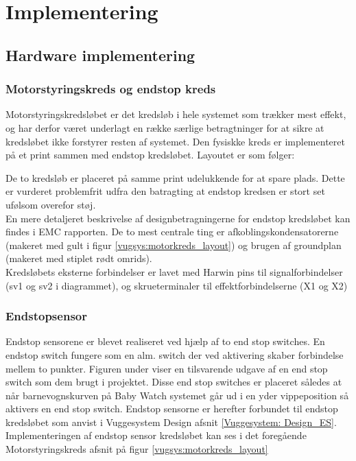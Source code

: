 \section{Implementering}
\label{Vuggesystem: Implementering} 
\subsection{Hardware implementering}

\subsubsection{Motorstyringskreds og endstop kreds}
Motorstyringskredsløbet er det kredsløb i hele systemet som trækker mest effekt, og har derfor været underlagt en række særlige betragtninger for at sikre at kredsløbet ikke forstyrer resten af systemet. Den fysiskke kreds er implementeret på et print sammen med endstop kredsløbet. Layoutet er som følger:


De to kredsløb er placeret på samme print udelukkende for at spare plads. Dette er vurderet problemfrit udfra den batragting at endstop kredsen er stort set ufølsom overefor støj.\\

En mere detaljeret beskrivelse af designbetragningerne for endstop kredsløbet kan findes i EMC rapporten. De to mest centrale ting er afkoblingskondensatorerne (makeret med gult i figur \ref{vugsys:motorkreds_layout}) og brugen af groundplan (makeret med stiplet rødt omrids). \\

Kredsløbets eksterne forbindelser er lavet med Harwin pins til signalforbindelser (sv1 og sv2 i diagrammet), og skrueterminaler til effektforbindelserne (X1 og X2)

\newpage
\subsubsection{Endstopsensor}\label{Vuggesystem: Implementering_ES} 
Endstop sensorene er blevet realiseret ved hjælp af to end stop switches. En endstop switch fungere som en alm. switch der ved aktivering skaber forbindelse mellem to punkter. Figuren under viser en tilsvarende udgave af en end stop switch som dem brugt i projektet.
 Disse end stop switches er placeret således at når barnevognskurven på Baby Watch systemet går ud i en yder vippeposition så aktivers en end stop switch.
Endstop sensorne er herefter forbundet til endstop kredsløbet som anvist i Vuggesystem Design afsnit \vref{Vuggesystem: Design_ES}. \\
Implementeringen af endstop sensor kredsløbet kan ses i det foregående Motorstyringskreds afsnit på figur \vref{vugsys:motorkreds_layout}
\newpage
